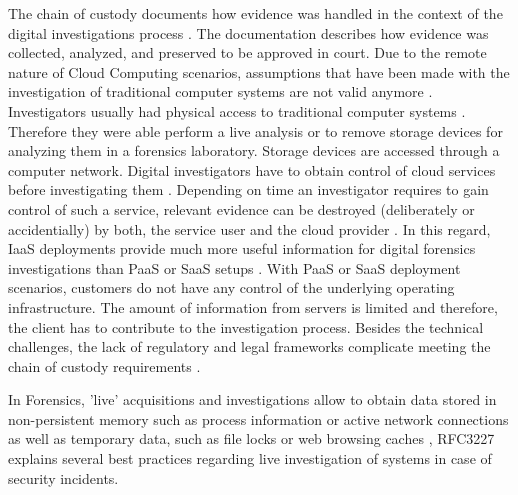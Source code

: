 \documentclass[runningheads,a4paper]{llncs}
\begin{document}
The chain of custody documents how evidence was handled in the context of the digital investigations process \cite{Casey2011}. The documentation describes how evidence was collected, analyzed, and preserved to be approved in court. Due to the remote nature of Cloud Computing scenarios, assumptions that have been made with the investigation of traditional computer systems are not valid anymore \cite{Reilly2010}. Investigators usually had physical access to traditional computer systems \cite{Zimmerman2011}. Therefore they were able perform a live analysis or to remove storage devices for analyzing them in a forensics laboratory. Storage devices are accessed through a computer network. Digital investigators have to obtain control of cloud services before investigating them \cite{Ruan2011}. Depending on time an investigator requires to gain control of such a service, relevant evidence can be destroyed (deliberately or accidentially) by both, the service user and the cloud provider \cite{Grispos2011}. In this regard, IaaS deployments provide much more useful information for digital forensics investigations than PaaS or SaaS setups \cite{Birk2011,Birk2011a}. With PaaS or SaaS deployment scenarios, customers do not have any control of the underlying operating infrastructure. The amount of information from servers is limited and therefore, the client has to contribute to the investigation process. Besides the technical challenges, the lack of regulatory and legal frameworks complicate meeting the chain of custody requirements \cite{Wang2010}. 

In Forensics, 'live' acquisitions and investigations allow to obtain data stored in non-persistent memory such as process information or active network connections \cite{Barrett2010} as well as temporary data, such as file locks or web browsing caches \cite{Birk2011,Grispos2011}, RFC3227 \cite{Brezinski2002} explains several best practices regarding live investigation of systems in case of security incidents. 
\end{document}
